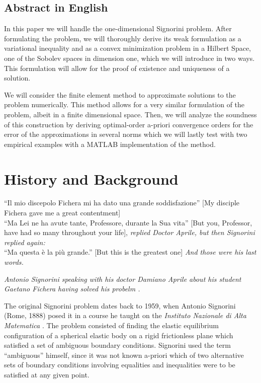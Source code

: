 \documentclass[headsepline,footsepline,footinclude=false,oneside,fontsize=11pt,paper=a4,listof=totoc,bibliography=totoc]{scrbook} %
\begin{document}
\section*{Abstract in English}
In this paper we will handle the one-dimensional Signorini problem. After formulating the problem, we will thoroughly derive its weak formulation as a variational inequality and as a convex minimization problem in a Hilbert Space, one of the Sobolev spaces in dimension one, which we will introduce in two ways. This formulation will allow for the proof of existence and uniqueness of a solution. 

We will consider the finite element method to approximate solutions to the problem numerically. This method allows for a very similar formulation of the problem, albeit in a finite dimensional space. Then, we will analyze the soundness of this construction by deriving optimal-order a-priori convergence orders for the error of the approximations in several norms which we will lastly test with two empirical examples with a MATLAB implementation of the method.



\newpage
{}
\tableofcontents{}
\clearpage


\chapter{History and Background}  \setcounter{page}{1}   %
\epigraph{``Il mio discepolo Fichera mi ha dato una grande soddisfazione'' [My disciple Fichera gave me a great contentment] \\
	``Ma Lei ne ha avute tante, Professore, durante la Sua vita'' [But you, Professor, have had so many throughout your life], \textit{replied Doctor Aprile, but then Signorini replied again:} \\
	``Ma questa è la più grande.'' [But this is the greatest one] \textit{And those were his last words.}
}{\textit{Antonio Signorini speaking with his doctor Damiano Aprile about his student Gaetano Fichera having solved his probelm \cite{Fichera95}.}}

The original Signorini problem dates back to 1959, when Antonio Signorini (Rome, 1888) posed it in a course he taught on the \textit{Instituto Nazionale di Alta Matematica} \cite{signorini59}. The problem consisted of finding the elastic equilibrium configuration of a spherical elastic body on a rigid frictionless plane which satisfied a set of ambiguous boundary conditions. Signorini used the term ``ambiguous'' himself, since it was not known a-priori which of two alternative sets of boundary conditions involving equalities and inequalities were to be satisfied at any given point. 
\end{document}
